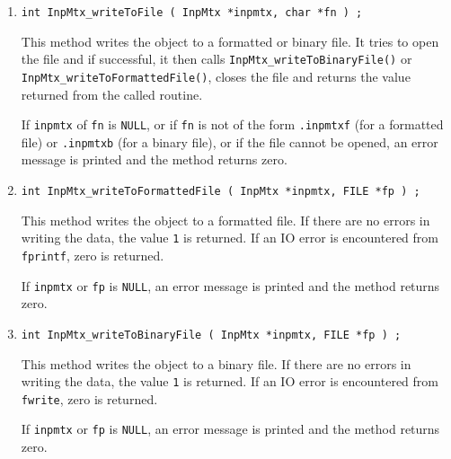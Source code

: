 \begin{enumerate}
\item
\begin{verbatim}
int InpMtx_writeToFile ( InpMtx *inpmtx, char *fn ) ;
\end{verbatim}
\par
This method writes the object to a formatted or binary file.
It tries to open the file and if successful, 
it then calls 
{\tt InpMtx\_writeToBinaryFile()}
or
{\tt InpMtx\_writeToFormattedFile()},
closes the file
and returns the value returned from the called routine.
\par {}
If {\tt inpmtx} of {\tt fn} is {\tt NULL},
or if {\tt fn} is not of the form
{\tt *.inpmtxf} (for a formatted file) 
or {\tt *.inpmtxb} (for a binary file),
or if the file cannot be opened,
an error message is printed and the method returns zero.
\item
\begin{verbatim}
int InpMtx_writeToFormattedFile ( InpMtx *inpmtx, FILE *fp ) ;
\end{verbatim}
\par
This method writes the object to a formatted file.
If there are no errors in writing the data, 
the value {\tt 1} is returned.
If an IO error is encountered from {\tt fprintf}, zero is returned.
\par {}
If {\tt inpmtx} or {\tt fp} is {\tt NULL},
an error message is printed and the method returns zero.
\item
\begin{verbatim}
int InpMtx_writeToBinaryFile ( InpMtx *inpmtx, FILE *fp ) ;
\end{verbatim}
\par
This method writes the object to a binary file.
If there are no errors in writing the data, 
the value {\tt 1} is returned.
If an IO error is encountered from {\tt fwrite}, zero is returned.
\par {}
If {\tt inpmtx} or {\tt fp} is {\tt NULL},
an error message is printed and the method returns zero.

\end{enumerate}
